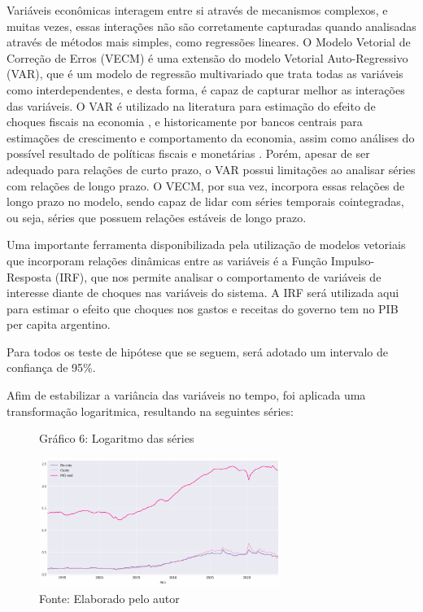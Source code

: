 \documentclass[a4paper, 12pt, openany, oneside, brazil]{abntex2}
\begin{document}
Variáveis econômicas interagem entre si através de mecanismos complexos, e muitas vezes, essas interações não são corretamente capturadas quando analisadas através de métodos mais simples, como regressões lineares. O Modelo Vetorial de Correção de Erros (VECM) é uma extensão do modelo Vetorial Auto-Regressivo (VAR), que é um modelo de regressão multivariado que trata todas as variáveis como interdependentes, e desta forma, é capaz de capturar melhor as interações das variáveis. O VAR é utilizado na literatura para estimação do efeito de choques fiscais na economia \cite{Blanchard2002}, e historicamente por bancos centrais para estimações de crescimento e comportamento da economia, assim como análises do possível resultado de políticas fiscais e monetárias \cite{bcb_relatorio_inflacao_2010}. Porém, apesar de ser adequado para relações de curto prazo, o VAR possui limitações ao analisar séries com relações de longo prazo. O VECM, por sua vez, incorpora essas relações de longo prazo no modelo, sendo capaz de lidar com séries temporais cointegradas, ou seja, séries que possuem relações estáveis de longo prazo.

Uma importante ferramenta disponibilizada pela utilização de modelos vetoriais que incorporam relações dinâmicas entre as variáveis é a Função Impulso-Resposta (IRF), que nos permite analisar o comportamento de variáveis de interesse diante de choques nas variáveis do sistema. A IRF será utilizada aqui para estimar o efeito que choques nos gastos e receitas do governo tem no PIB per capita argentino.

Para todos os teste de hipótese que se seguem, será adotado um intervalo de confiança de 95\%.

Afim de estabilizar a variância das variáveis no tempo, foi aplicada uma transformação logaritmica, resultando na seguintes séries:

\begin{figure}[h!]
	\caption*{Gráfico 6: Logaritmo das séries}
	\includegraphics[width=0.7\textwidth]{metodologia/logaritmo}
	\caption*{Fonte: Elaborado pelo autor}
\end{figure}
\end{document}
